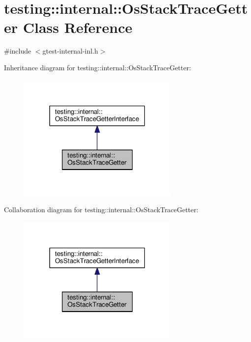 \hypertarget{classtesting_1_1internal_1_1OsStackTraceGetter}{}\section{testing\+:\+:internal\+:\+:Os\+Stack\+Trace\+Getter Class Reference}
\label{classtesting_1_1internal_1_1OsStackTraceGetter}


{\ttfamily \#include $<$gtest-\/internal-\/inl.\+h$>$}



Inheritance diagram for testing\+:\+:internal\+:\+:Os\+Stack\+Trace\+Getter\+:\nopagebreak
\begin{figure}[H]
\begin{center}
\leavevmode
\includegraphics[width=225pt]{classtesting_1_1internal_1_1OsStackTraceGetter__inherit__graph}
\end{center}
\end{figure}


Collaboration diagram for testing\+:\+:internal\+:\+:Os\+Stack\+Trace\+Getter\+:\nopagebreak
\begin{figure}[H]
\begin{center}
\leavevmode
\includegraphics[width=225pt]{classtesting_1_1internal_1_1OsStackTraceGetter__coll__graph}
\end{center}
\end{figure}
